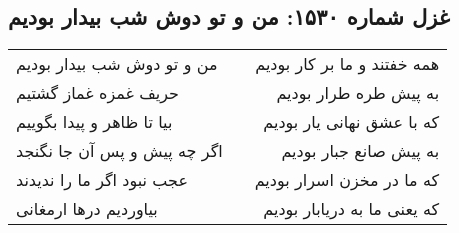 \begin{center}
\section*{غزل شماره ۱۵۳۰: من و تو دوش شب بیدار بودیم}
\label{sec:1530}
\begin{longtable}{l p{0.5cm} r}
من و تو دوش شب بیدار بودیم
&&
همه خفتند و ما بر کار بودیم
\\
حریف غمزه غماز گشتیم
&&
به پیش طره طرار بودیم
\\
بیا تا ظاهر و پیدا بگوییم
&&
که با عشق نهانی یار بودیم
\\
اگر چه پیش و پس آن جا نگنجد
&&
به پیش صانع جبار بودیم
\\
عجب نبود اگر ما را ندیدند
&&
که ما در مخزن اسرار بودیم
\\
بیاوردیم درها ارمغانی
&&
که یعنی ما به دریابار بودیم
\\
\end{longtable}
\end{center}
